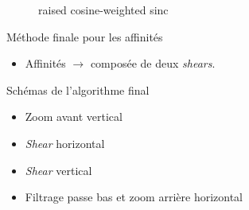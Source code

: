 \documentclass[c,12pt]{beamer}
\newcommand{\ra}[0]{\rightarrow}
\begin{document}
\begin{frame}
\begin{figure}
\centering
{}
\caption{raised cosine-weighted sinc}
\end{figure}
\end{frame}


\begin{frame}{Méthode finale pour les affinités}
\begin{itemize}
\item Affinités $\ra$ composée de deux \emph{shears}.

\end{itemize}

\begin{block}{Schémas de l'algorithme final}

\begin{itemize}
\item Zoom avant vertical
\item \emph{Shear} horizontal
\item \emph{Shear} vertical
\item Filtrage passe bas et zoom arrière horizontal
\end{itemize}

\end{block}

\end{frame}
    
\end{document}
